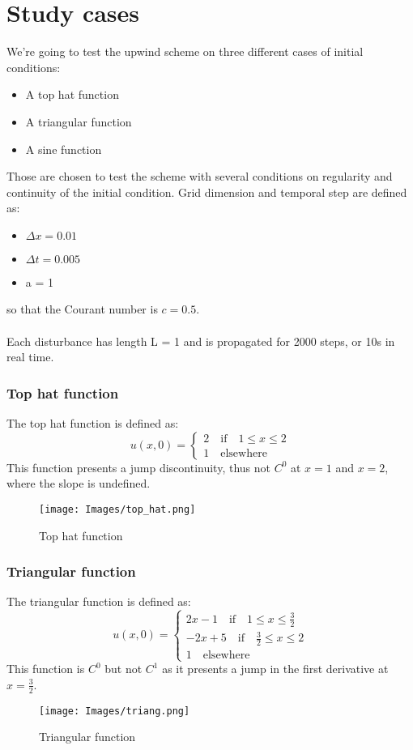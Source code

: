 \documentclass{report}
\begin{document}
\section*{Study cases}
We're going to test the upwind scheme on three different cases of initial conditions:
\begin{itemize}
    \item A top hat function
    \item A triangular function
    \item A sine function
\end{itemize}
Those are chosen to test the scheme with several conditions on regularity and continuity of the initial condition.
Grid dimension and temporal step are defined as:
\begin{itemize}[label={}]
    \item $\Delta x = 0.01$
    \item $\Delta t = 0.005$
    \item a = 1
\end{itemize}
so that the Courant number is $c = 0.5$.\\\\
Each disturbance has length L = 1 and is propagated for 2000 steps, or 10s in real time.
\subsubsection*{Top hat function}
The top hat function is defined as:
\begin{equation*}
    u(x,0) = \begin{cases}
        2 \quad \textrm{if} \quad 1 \leq x \leq 2 \\
        1 \quad \textrm{elsewhere}
    \end{cases}
\end{equation*}
This function presents a jump discontinuity, thus not $C^0$ at $x = 1$ and $x = 2$, where the slope is undefined.
\begin{figure}[H]
    \centering
    \texttt{[image: Images/top\_hat.png]}
    \caption{Top hat function}
    \label{fig:top_hat}
\end{figure}
\subsubsection*{Triangular function}
The triangular function is defined as:
\begin{equation*}
    u(x,0) = \begin{cases}
        2x - 1 \quad \textrm{if} \quad 1 \leq x \leq \frac{3}{2} \\
        -2x+5 \quad \textrm{if} \quad \frac{3}{2} \leq x \leq 2  \\
        1 \quad \textrm{elsewhere}
    \end{cases}
\end{equation*}
This function is $C^0$ but not $C^1$ as it presents a jump in the first derivative at $x = \frac{3}{2}$.
\begin{figure}[H]
    \centering
    \texttt{[image: Images/triang.png]}
    \caption{Triangular function}
    \label{fig:triang}
\end{figure}
\end{document}

